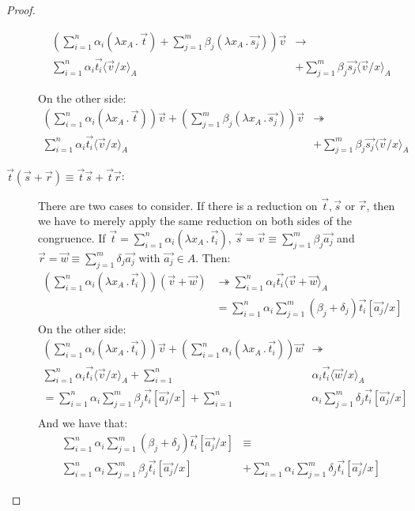 \documentclass[runningheads,orivec]{llncs}
\newcommand\ansubst[2]{\ensuremath{\langle #1 \rangle_{#2}}}
\def\Lam#1#2#3{\lambda#1_{#2}\,{.}\,#3} %
\def\evalone{\rightarrow}
\def\eval{\twoheadrightarrow}
\begin{document}
\begin{proof}
\begin{description}
    \begin{align*}
    (\sum_{i=1}^{n}\alpha_i (\Lam{x}{A}{\vec t})+\sum_{j=1}^{m}\beta_j(\Lam{x}{A}{\vec{s_j}}))\vec{v} &\evalone\\
    \sum_{i=1}^{n}\alpha_i\vec{t_i}\ansubst{\vec{v}/x}{A} &+ \sum_{j=1}^{m}\beta_j\vec{s_j}\ansubst{\vec{v}/x}{A}
    \end{align*}

    On the other side:
    \begin{align*}
    (\sum_{i=1}^{n}\alpha_i (\Lam{x}{A}{\vec t})) \vec{v}+(\sum_{j=1}^{m}\beta_j(\Lam{x}{A}{\vec{s_j}}))\vec{v} &\eval\\
    \sum_{i=1}^{n}\alpha_i\vec{t_i}\ansubst{\vec{v}/x}{A} &+ \sum_{j=1}^{m}\beta_j\vec{s_j}\ansubst{\vec{v}/x}{A}
    \end{align*}

    \item[$\vec{t}(\vec{s}+\vec{r})\equiv\vec{t}\vec{s} + \vec{t}\vec{r}$:] There are two cases to consider. If there is a reduction on $\vec{t},\vec{s}$ or $\vec{r}$, then we have to merely apply the same reduction on both sides of the congruence. If $\vec{t}=\sum_{i=1}^{n}\alpha_i(\Lam{x}{A}{\vec{t_i}})$, $\vec{s}=\vec{v}\equiv\sum_{j=1}^{m}\beta_j \vec{a_j}$ and $\vec{r}=\vec{w}\equiv\sum_{j=1}^{m}\delta_j \vec{a_j}$ with $\vec{a_j}\in A$. Then:
    \begin{align*}
    (\sum_{i=1}^{n}\alpha_i(\Lam{x}{A}{\vec{t_i}}))(\vec{v}+ \vec{w}) &\eval \sum_{i=1}^{n}\alpha_i\vec{t_i}\ansubst{\vec{v}+\vec{w}}{A}\\
    &=\sum_{i=1}^{n}\alpha_i \sum_{j=1}^{m} (\beta_j+\delta_j) \vec{t_i}[\vec{a_j}/x]
  \end{align*}
    On the other side:
    \begin{align*}
      (\sum_{i=1}^{n}\alpha_i(\Lam{x}{A}{\vec{t_i}}))\vec{v} + (\sum_{i=1}^{n}\alpha_i(\Lam{x}{A}{\vec{t_i}}))\vec{w} &\eval\\
      \sum_{i=1}^{n}\alpha_i\vec{t_i}\ansubst{\vec{v}/x}{A} + \sum_{i=1}^{n}&\alpha_i\vec{t_i}\ansubst{\vec{w}/x}{A}\\ 
      =\sum_{i=1}^{n}\alpha_i\sum_{j=1}^{m}\beta_j \vec{t_i}[\vec{a_j}/x] + \sum_{i=1}^{n}&\alpha_i\sum_{j=1}^{m}\delta_j\vec{t_i}[\vec{a_j}/x]\\
    \end{align*}
    And we have that:
    \begin{align*}
    \sum_{i=1}^{n}\alpha_i \sum_{j=1}^{m} (\beta_j+\delta_j) \vec{t_i}[\vec{a_j}/x]&\equiv\\
    \sum_{i=1}^{n}\alpha_i\sum_{j=1}^{m}\beta_j \vec{t_i}[\vec{a_j}/x] &+ \sum_{i=1}^{n}\alpha_i\sum_{j=1}^{m}\delta_j\vec{t_i}[\vec{a_j}/x]
    \end{align*}


\end{description}
\end{proof}
\end{document}
